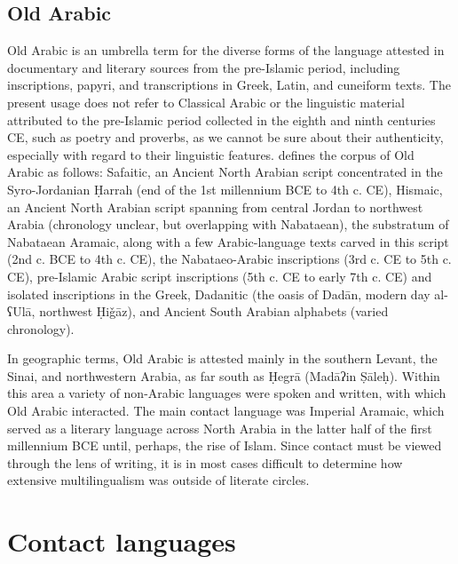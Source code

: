\documentclass[output=paper]{langsci/langscibook}
\begin{document}
\subsection{Old Arabic}
Old Arabic is an umbrella term for the diverse forms of the language attested in documentary and literary sources from the pre-Islamic period, including inscriptions, papyri, and transcriptions in Greek, Latin, and cuneiform texts. The present usage does not refer to Classical Arabic or the linguistic material attributed to the pre-Islamic period collected in the eighth and ninth centuries CE, such as poetry and proverbs, as we cannot be sure about their authenticity, especially with regard to their linguistic features. \citet{Al-Jallad2017early} defines the corpus of Old Arabic as follows: Safaitic, an Ancient North Arabian script concentrated in the Syro-Jordanian Ḥarrah (end of the 1st millennium BCE to 4th c. CE), Hismaic, an Ancient North Arabian script spanning from central Jordan to northwest Arabia (chronology unclear, but overlapping with Nabataean), the substratum of Nabataean Aramaic, along with a few Arabic-language texts carved in this script (2nd c. BCE to 4th c. CE), the Nabataeo-Arabic inscriptions (3rd c. CE to 5th c. CE), pre-Islamic Arabic script inscriptions (5th c. CE to early 7th c. CE) and isolated inscriptions in the Greek, Dadanitic (the oasis of Dadān, modern day al-ʕUlā, northwest Ḥiǧāz), and Ancient South Arabian alphabets (varied chronology). 

In geographic terms, Old Arabic is attested mainly in the southern Levant, the Sinai, and northwestern Arabia, as far south as Ḥegrā (Madāʔin Ṣāleḥ). Within this area a variety of non-Arabic languages were spoken and written, with which Old Arabic interacted. The main contact language was Imperial Aramaic, which served as a literary language across North Arabia in the latter half of the first millennium BCE until, perhaps, the rise of Islam. Since contact must be viewed through the lens of writing, it is in most cases difficult to determine how extensive multilingualism was outside of literate circles.

\section{Contact languages}
\end{document}
